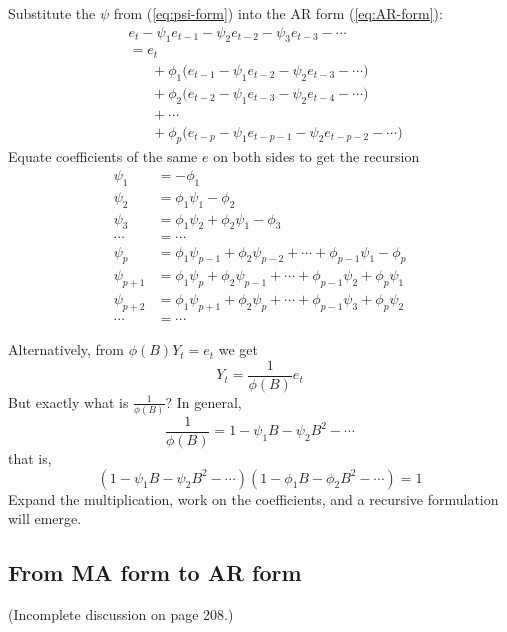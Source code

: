 \documentclass[12pt]{article}
\begin{document}
Substitute the $\psi$ from (\ref{eq:psi-form})
into the AR form (\ref{eq:AR-form}):
\[
\begin{split}
& e_t - \psi_1 e_{t-1} - \psi_2 e_{t-2} - \psi_3 e_{t-3} -\dotsb
\\
&= e_t
\\
&\phantom{\mathrel{=}\;}
    +
    \phi_1\bigl(e_{t-1} - \psi_1 e_{t-2} - \psi_2 e_{t-3}
        -\dotsb\bigr)
\\
&\phantom{\mathrel{=}\;}
    +
    \phi_2\bigl(e_{t-2} - \psi_1 e_{t-3} - \psi_2 e_{t-4}
        -\dotsb\bigr)
\\
&\phantom{\mathrel{=}\;}
    +\dotsb
\\
&\phantom{\mathrel{=}\;}
    +
    \phi_p\bigl(e_{t-p} - \psi_1 e_{t-p-1} - \psi_2 e_{t-p-2}
        -\dotsb\bigr)
\end{split}
\]
Equate coefficients of the same $e$ on both sides to get
the recursion
\[
\begin{split}
\psi_1 &= -\phi_1 \\
\psi_2 &= \phi_1\psi_1 - \phi_2 \\
\psi_3 &= \phi_1\psi_2 + \phi_2\psi_1 - \phi_3\\
\dotsb &= \dotsb \\
\psi_p &= \phi_1\psi_{p-1} + \phi_2\psi_{p-2}
            +\dotsb + \phi_{p-1} \psi_1 - \phi_p \\
\psi_{p+1} &= \phi_1\psi_{p} + \phi_2\psi_{p-1}
            +\dotsb + \phi_{p-1} \psi_2 + \phi_p\psi_1 \\
\psi_{p+2} &= \phi_1\psi_{p+1} + \phi_2\psi_{p}
            +\dotsb + \phi_{p-1} \psi_3 + \phi_p\psi_2 \\
\dotsb &= \dotsb
\end{split}
\]


Alternatively,
from $\phi(B) Y_t = e_t$ we get
\[
Y_t = \frac{1}{\phi(B)} e_t
\]
But exactly what is
$\frac{1}{\phi(B)}$?
In general,
\[
\frac{1}{\phi(B)}
= 1 - \psi_1 B - \psi_2 B^2 - \dotsb
\]
that is,
\[
(1 - \psi_1 B - \psi_2 B^2 - \dotsb)
    (1 - \phi_1 B - \phi_2 B^2 - \dotsb)
= 1
\]
Expand the multiplication,
work on the coefficients,
and a recursive formulation will emerge.


\subsection{From MA form to AR form}

(Incomplete discussion on page 208.)
\end{document}
